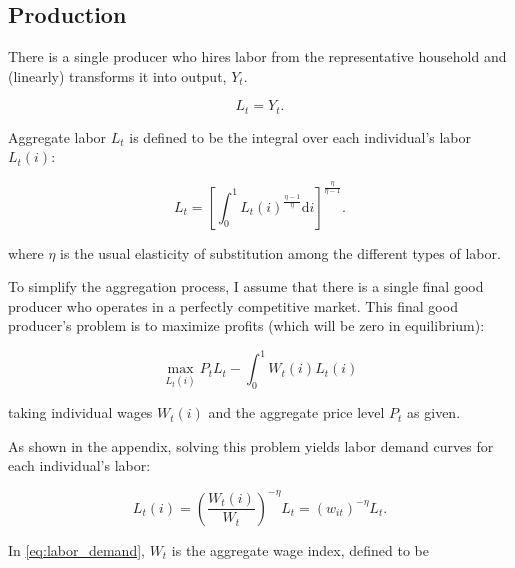 \documentclass[12pt,a4paper]{scrartcl}            %
\begin{document}
\subsection{Production}
\label{sub:production}

There is a single producer who hires labor from the representative household and (linearly) transforms it into output, $Y_t$.

\begin{equation} \label{eq:agg_output}
    L_t = Y_t.
\end{equation}

Aggregate labor \(L_t\) is defined to be the integral over each individual's labor \(L_t(i)\):

\begin{equation} \label{eq:agg_labor}
    L_t = \left[ \int_0^1 L_t(i)^{\frac{\eta - 1}{\eta}} \mathrm{d}i \right]^{\frac{\eta}{\eta - 1}}.
\end{equation}

where $\eta$ is the usual elasticity of substitution among the different types of labor.

To simplify the aggregation process, I assume that there is a single final good producer who operates in a perfectly competitive market.
This final good producer's problem is to maximize profits (which will be zero in equilibrium):

\begin{equation} \label{eq:firms_problem}
    \max_{L_t(i)} P_t L_t - \int_0^1 W_t(i)L_t(i)
\end{equation}

taking individual wages $W_t(i)$ and the aggregate price level $P_t$ as given.

As shown in the appendix, solving this problem yields labor demand curves for each individual's labor:

\begin{equation}
    \label{eq:labor_demand}
    L_t(i) = \left( \frac{W_t(i)}{W_t} \right)^{-\eta}L_t = (w_{it})^{-\eta}L_t.
\end{equation}

In \ref{eq:labor_demand}, $W_t$ is the aggregate wage index, defined to be
\end{document}

